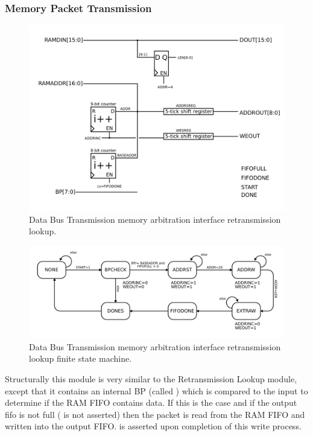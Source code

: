 \subsubsection{Memory Packet Transmission}
\begin{figure}
\begin{centering}
\includegraphics[scale=0.8]{memarbit.pktoutput.svg}
\end{centering}
\caption{Data Bus Transmission memory arbitration interface retransmission lookup.}
\label{memarbit.retx}
\end{figure}

\begin{figure}
\begin{centering}
\includegraphics[scale=0.8]{memarbit.pktoutput.fsm.svg}
\end{centering}
\caption{Data Bus Transmission memory arbitration interface retransmission lookup finite state machine.}
\label{memarbit.retx.fsm}
\end{figure}

Structurally this module is very similar to the Retransmission Lookup
module, except that it contains an internal BP (called
) which is compared to the input
 to determine if the RAM FIFO contains data.  If this
is the case and if the output fifo is not full ( is
not asserted) then the packet is read from the RAM FIFO and written
into the output FIFO.  is asserted upon completion of
this write process.


